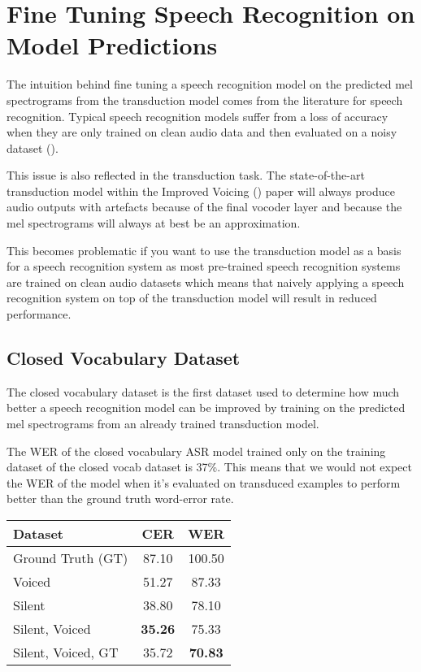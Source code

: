 \section{Fine Tuning Speech Recognition on Model Predictions}

The intuition behind fine tuning a speech recognition model on the
predicted mel spectrograms from the transduction model comes
from the literature for speech recognition. Typical speech recognition models
suffer from a loss of accuracy when they are only trained on clean audio data
and then evaluated on a noisy dataset (\cite{DS2_original}).

This issue is also reflected in the transduction task. The state-of-the-art
transduction model within the Improved Voicing (\cite{gaddy2021improved}) paper
will always produce audio outputs with artefacts because of the final vocoder layer
and because the mel spectrograms will always at best be an approximation.

This becomes problematic if you want to use the transduction model as a basis for a
speech recognition system as most pre-trained speech recognition systems
are trained on clean audio datasets which means that naively applying a speech
recognition system on top of the transduction model will result in reduced performance.

\subsection{Closed Vocabulary Dataset}

The closed vocabulary dataset is the first dataset used to determine how much better
a speech recognition model can be improved by training on the predicted mel spectrograms
from an already trained transduction model.

The WER of the closed vocabulary ASR model trained only on the training dataset
of the closed vocab dataset is 37\%. This means that we would not expect the WER
of the model when it's evaluated on transduced examples to perform better than
the ground truth word-error rate.

{\small\begin{center}
\begin{tabular} {  l  c  c  }
\hline
\textbf{Dataset} & \textbf{CER} & \textbf{WER} \\
\hline
Ground Truth (GT) & 87.10 & 100.50 \\
Voiced & 51.27 & 87.33 \\
Silent & 38.80 & 78.10 \\
Silent, Voiced & \textbf{35.26} & 75.33 \\
\hline
Silent, Voiced, GT & 35.72 & \textbf{70.83} \\
\hline
\end{tabular}
\end{center}}

